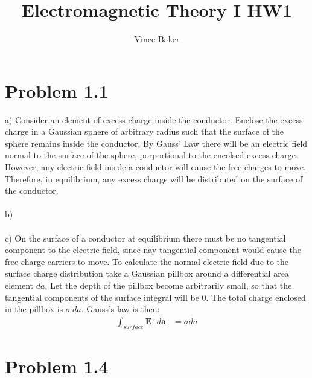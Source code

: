 \documentclass[a4paper,11pt]{article}
\title{Electromagnetic Theory I HW1}
\author{Vince Baker}
\numberwithin{equation}{section}
\newcommand{\bv}[1]{\mathbf{#1}}
\begin{document}
\maketitle

\section{Problem 1.1}
a) Consider an element of excess charge inside the conductor.
Enclose the excess charge in a Gaussian sphere of arbitrary radius such that the surface of the sphere remains inside the conductor. 
By Gauss' Law there will be an electric field normal to the surface of the sphere, porportional to the encolsed excess charge.
However, any electric field inside a conductor will cause the free charges to move. 
Therefore, in equilibrium, any excess charge will be distributed on the surface of the conductor.
\\ \\
b)
\\ \\
c) On the surface of a conductor at equilibrium there must be no tangential component to the electric field, since nay tangential component would cause the free charge carriers to move.
To calculate the normal electric field due to the surface charge distribution take a Gaussian pillbox around a differential area element $da$.
Let the depth of the pillbox become arbitrarily small, so that the tangential components of the surface integral will be 0.
The total charge enclosed in the pillbox is $\sigma \  da$.
Gauss's law is then:
\begin{align}
 \int_{surface}\bv{E} \cdot d\bv{a} &= \sigma da
\end{align}



\section{Problem 1.4}
\end{document}
